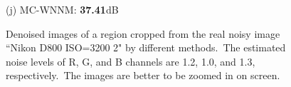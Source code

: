 \documentclass[10pt,onecolumn,letterpaper]{article}
\begin{document}
\begin{figure}[!htbp]
{\begin{minipage}[t]{0.24\textwidth}
{\footnotesize (j) MC-WNNM: \textbf{37.41}dB}
\end{minipage}
}
\caption{Denoised images of a region cropped from the real noisy image ``Nikon D800 ISO=3200 2" \cite{crosschannel2016} by different methods.\ The estimated noise levels of R, G, and B channels are 1.2, 1.0, and 1.3, respectively.\ The images are better to be zoomed in on screen.}
\label{f13}
\end{figure}

\begin{figure}[!htbp]
\centering
{}
\end{figure}
\end{document}
